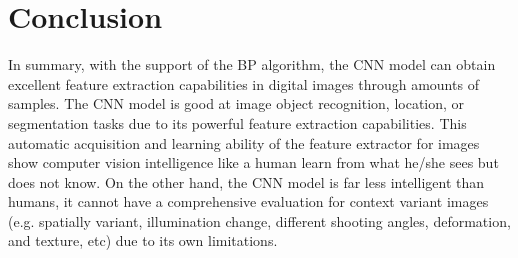 \documentclass[10pt, a4paper]{IEEEtran} %
\begin{document}
	\section{Conclusion} %
	In summary, with the support of the BP algorithm, the CNN model can obtain excellent feature extraction capabilities in digital images through amounts of samples. The CNN model is good at image object recognition, location, or segmentation tasks due to its powerful feature extraction capabilities. This automatic acquisition and learning ability of the feature extractor for images show computer vision intelligence like a human learn from what he/she sees but does not know. On the other hand, the CNN model is far less intelligent than humans, it cannot have a comprehensive evaluation for context variant images (e.g. spatially variant, illumination change, different shooting angles, deformation, and texture, etc) due to its own limitations. 


	
	  

\end{document}
